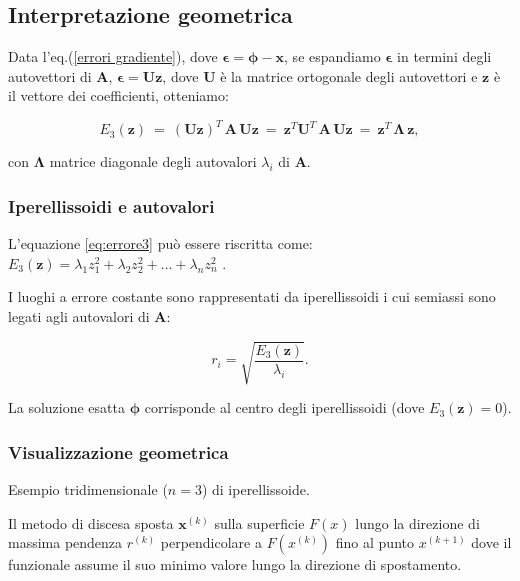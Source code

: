 %
%
%
\subsection{Interpretazione geometrica}

Data l'eq.(\eqref{errori gradiente}), dove \(\mathbf{\epsilon} = \mathbf{\phi} - \mathbf{x}\), se espandiamo \(\mathbf{\epsilon}\) in termini degli autovettori di \(\mathbf{A}\), $\mathbf{\epsilon} = \mathbf{U} \mathbf{z}$, dove \(\mathbf{U}\) è la matrice ortogonale degli autovettori e \(\mathbf{z}\) è il vettore dei coefficienti, otteniamo:

\begin{equation*}
	E_3(\mathbf{z})\ =\  (\mathbf{U} \mathbf{z})^T\, \mathbf{A}\, \mathbf{U} \mathbf{z}\ =\ \mathbf{z}^T \mathbf{U}^T\, \mathbf{A}\, \mathbf{U} \mathbf{z}\ =\ \mathbf{z}^T\, \mathbf{\Lambda}\, \mathbf{z},
\end{equation*}

con \(\mathbf{\Lambda}\) matrice diagonale degli autovalori \(\lambda_i\) di \(\mathbf{A}\).

\subsubsection{Iperellissoidi e autovalori}

L’equazione \eqref{eq:errore3} può essere riscritta come: $E_3(\mathbf{z}) = \lambda_1 z_1^2 + \lambda_2 z_2^2 + \dots + \lambda_n z_n^2$ .

I luoghi a errore costante sono rappresentati da iperellissoidi i cui semiassi sono legati agli autovalori di \(\mathbf{A}\):

\begin{equation*}
	r_i = \sqrt{\frac{E_3(\mathbf{z})}{\lambda_i}}.
\end{equation*}

La soluzione esatta \(\mathbf{\phi}\) corrisponde al centro degli iperellissoidi (dove \(E_3(\mathbf{z}) = 0\)).

\subsubsection{Visualizzazione geometrica}
Esempio tridimensionale (\(n=3\)) di iperellissoide.

Il metodo di discesa sposta \(\mathbf{x}^{(k)}\) sulla superficie $F(x)$ lungo la direzione di massima pendenza $r^{(k)}$ perpendicolare a $F(x^{(k)})$ fino al punto $x^{(k+1)}$ dove il funzionale assume il suo minimo valore lungo la direzione di spostamento.

